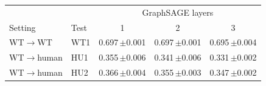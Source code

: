 \begin{tabular}{llccc}
\toprule
 & & \multicolumn{3}{c}{GraphSAGE layers} \\
Setting & Test & 1 & 2 & 3 \\
\midrule
WT$\to$WT & WT1 & 0.697\,{\scriptsize$\pm$0.001} & 0.697\,{\scriptsize$\pm$0.001} & 0.695\,{\scriptsize$\pm$0.004} \\
WT$\to$human & HU1 & 0.355\,{\scriptsize$\pm$0.006} & 0.341\,{\scriptsize$\pm$0.006} & 0.331\,{\scriptsize$\pm$0.002} \\
WT$\to$human & HU2 & 0.366\,{\scriptsize$\pm$0.004} & 0.355\,{\scriptsize$\pm$0.003} & 0.347\,{\scriptsize$\pm$0.002} \\
\bottomrule
\end{tabular}

